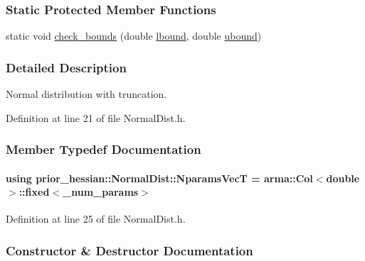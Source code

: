 \subsubsection*{Static Protected Member Functions}
\begin{DoxyCompactItemize}
\item 
static void \hyperlink{classprior__hessian_1_1UnivariateDist_aec85554be4019eb2c5d92203a4e6d9f8}{check\+\_\+bounds} (double \hyperlink{classprior__hessian_1_1NormalDist_a014544348da49767680758831c48ef85}{lbound}, double \hyperlink{classprior__hessian_1_1NormalDist_a2da1def4f2ddde1507b978e2e79eaf9c}{ubound})
\end{DoxyCompactItemize}


\subsubsection{Detailed Description}
Normal distribution with truncation. 



Definition at line 21 of file Normal\+Dist.\+h.



\subsubsection{Member Typedef Documentation}
\paragraph[{\texorpdfstring{Nparams\+VecT}{NparamsVecT}}]{\setlength{\rightskip}{0pt plus 5cm}using {\bf prior\+\_\+hessian\+::\+Normal\+Dist\+::\+Nparams\+VecT} =  arma\+::\+Col$<$double$>$\+::fixed$<$\+\_\+num\+\_\+params$>$}\hypertarget{classprior__hessian_1_1NormalDist_a3a82189e42c48ff21ad49d85c7d9cf5d}{}\label{classprior__hessian_1_1NormalDist_a3a82189e42c48ff21ad49d85c7d9cf5d}


Definition at line 25 of file Normal\+Dist.\+h.



\subsubsection{Constructor \& Destructor Documentation}
